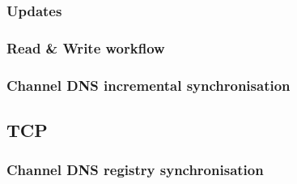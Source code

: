 \documentclass[a4paper]{article}
\begin{document}
            \subsubsection{Updates}
            \subsubsection{Read \& Write workflow}
            \subsubsection{Channel DNS incremental synchronisation}
        \subsection{TCP}
            \subsubsection{Channel DNS registry synchronisation}
\end{document}
